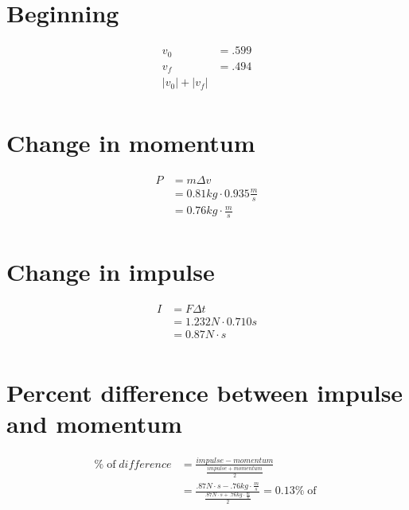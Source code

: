 \documentclass[12pt]{article}
\begin{document}
\section{Beginning}
\begin{align*}
v_{0}&=.599\\
v_{f}&=.494\\
\left|v_{0}\right|+\left|v_{f}\right|\\
\end{align*}
\section{Change in momentum}
\begin{align*}
P&=m\Delta v\\
&=0.81kg\cdot0.935\frac{m}{s}\\
&=0.76kg\cdot\frac{m}{s}\\
\end{align*}
\section{Change in impulse}
\begin{align*}
I&=F\Delta t\\
&=1.232N\cdot0.710s\\
&=0.87N\cdot s\\
\end{align*}
\section{Percent difference between impulse and momentum}
\begin{align*}
\%\operatorname{of}difference&=\frac{impulse-momentum}{\frac{impulse+momentum}{2}}\\
&=\frac{.87N\cdot s-.76kg\cdot\frac{m}{s}}{\frac{.87N\cdot s+.76kg\cdot\frac{m}{s}}{2}}=0.13\%\operatorname{of}\\
\end{align*}
\end{document}
